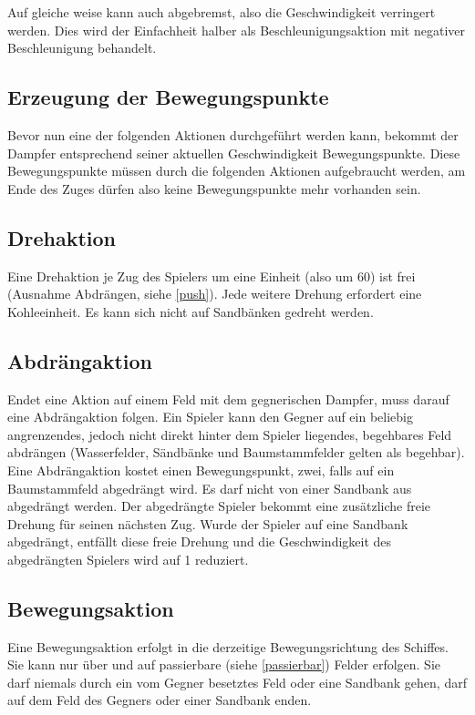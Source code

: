 \documentclass[12pt,a4paper, ngerman, oneside]{scrartcl}
\begin{document}
Auf gleiche weise kann auch abgebremst, also die Geschwindigkeit verringert
werden. Dies wird der Einfachheit halber als Beschleunigungsaktion mit negativer
Beschleunigung behandelt.

\subsection{Erzeugung der Bewegungspunkte}

Bevor nun eine der folgenden Aktionen durchgeführt werden kann, bekommt der
Dampfer entsprechend seiner aktuellen Geschwindigkeit Bewegungspunkte. Diese
Bewegungspunkte müssen durch die folgenden Aktionen aufgebraucht werden, am Ende
des Zuges dürfen also keine Bewegungspunkte mehr vorhanden sein.

\subsection{\label{turn}Drehaktion}

Eine Drehaktion je Zug des Spielers um eine Einheit (also um 60\degree) ist frei
(Ausnahme Abdrängen, siehe \ref{push}). Jede weitere Drehung erfordert eine
Kohleeinheit. Es kann sich nicht auf Sandbänken gedreht werden.


\subsection{\label{push}Abdrängaktion}

Endet eine Aktion auf einem Feld mit dem gegnerischen Dampfer, muss darauf eine
Abdrängaktion folgen. Ein Spieler kann den Gegner auf ein beliebig angrenzendes,
jedoch nicht direkt hinter dem Spieler liegendes, begehbares Feld abdrängen
(\label{passierbar}Wasserfelder, Sändbänke und Baumstammfelder gelten als
begehbar). Eine Abdrängaktion kostet einen Bewegungspunkt, zwei, falls auf ein
Baumstammfeld abgedrängt wird. Es darf nicht von einer Sandbank aus abgedrängt
werden. Der abgedrängte Spieler bekommt eine zusätzliche freie Drehung für
seinen nächsten Zug. Wurde der Spieler auf eine Sandbank abgedrängt, entfällt
diese freie Drehung und die Geschwindigkeit des abgedrängten Spielers wird auf 1
reduziert.

\subsection{\label{step}Bewegungsaktion}

Eine Bewegungsaktion erfolgt in die derzeitige Bewegungsrichtung des Schiffes.
Sie kann nur über und auf passierbare (siehe \ref{passierbar}) Felder erfolgen.
Sie darf niemals durch ein vom Gegner besetztes Feld oder eine Sandbank gehen,
darf auf dem Feld des Gegners oder einer Sandbank enden.
\end{document}
